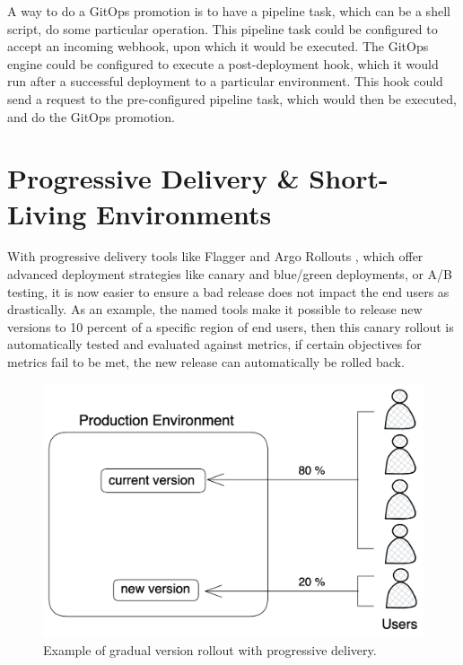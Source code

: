 A way to do a GitOps promotion is to have a pipeline task, which can be a shell script,
do some particular operation. This pipeline task could be configured to accept an incoming webhook,
upon which it would be executed.
The GitOps engine could be configured to execute a post-deployment hook,
which it would run after a successful deployment to a particular environment.
This hook could send a request to the pre-configured pipeline task, which would then be executed,
and do the GitOps promotion.












\section{Progressive Delivery \& Short-Living Environments}

With progressive delivery tools like
Flagger
\autocite{flaggerWebsite}
and
Argo Rollouts
\autocite{argoRolloutsWebsite},
which offer advanced deployment strategies
like canary and blue/green deployments, or A/B testing,
it is now easier to ensure a bad release does not impact the end users
as drastically.
As an example, the named tools make it possible to release new versions
to 10 percent of a specific region of end users,
then this canary rollout is automatically tested and evaluated against metrics,
if certain objectives for metrics fail to be met,
the new release can automatically be rolled back.

\begin{figure}[h]
	\centering
	\includegraphics[width=0.75\linewidth]{assets/progressive-delivery.png}
	\caption{Example of gradual version rollout with progressive delivery.
	}
	\label{fig:progressive-delivery}	
\end{figure}


